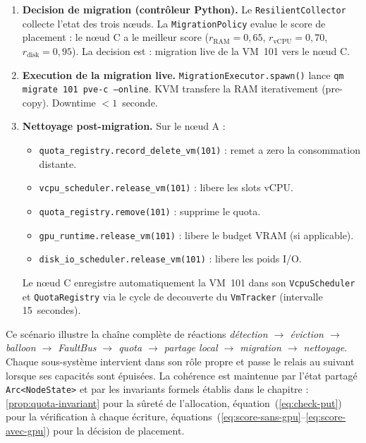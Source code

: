 \begin{enumerate}
    \item \textbf{Decision de migration (contr\^oleur Python).} Le \texttt{ResilientCollector} collecte l'etat des trois n\oe{}uds. La \texttt{MigrationPolicy} evalue le score de placement : le n\oe{}ud C a le meilleur score ($r_{\text{RAM}} = 0{,}65$, $r_{\text{vCPU}} = 0{,}70$, $r_{\text{disk}} = 0{,}95$). La decision est : migration live de la VM~101 vers le n\oe{}ud C.

    \item \textbf{Execution de la migration live.} \texttt{MigrationExecutor.spawn()} lance \texttt{qm migrate 101 pve-c --online}. KVM transfere la RAM iterativement (pre-copy). Downtime $< 1$~seconde.

    \item \textbf{Nettoyage post-migration.} Sur le n\oe{}ud A :
    \begin{itemize}
        \item \texttt{quota\_registry.record\_delete\_vm(101)} : remet a zero la consommation distante.
        \item \texttt{vcpu\_scheduler.release\_vm(101)} : libere les slots vCPU.
        \item \texttt{quota\_registry.remove(101)} : supprime le quota.
        \item \texttt{gpu\_runtime.release\_vm(101)} : libere le budget VRAM (si applicable).
        \item \texttt{disk\_io\_scheduler.release\_vm(101)} : libere les poids I/O.
    \end{itemize}
    Le n\oe{}ud C enregistre automatiquement la VM~101 dans son \texttt{VcpuScheduler} et \texttt{QuotaRegistry} via le cycle de decouverte du \texttt{VmTracker} (intervalle 15~secondes).
\end{enumerate}

Ce scénario illustre la chaîne complète de réactions \emph{détection $\to$ éviction $\to$ balloon $\to$ FaultBus $\to$ quota $\to$ partage local $\to$ migration $\to$ nettoyage}. Chaque sous-système intervient dans son rôle propre et passe le relais au suivant lorsque ses capacités sont épuisées. La cohérence est maintenue par l'état partagé \texttt{Arc<NodeState>} et par les invariants formels établis dans le chapitre : \autoref{prop:quota-invariant} pour la sûreté de l'allocation, équation~(\ref{eq:check-put}) pour la vérification à chaque écriture, équations~(\ref{eq:score-sans-gpu}--\ref{eq:score-avec-gpu}) pour la décision de placement.

